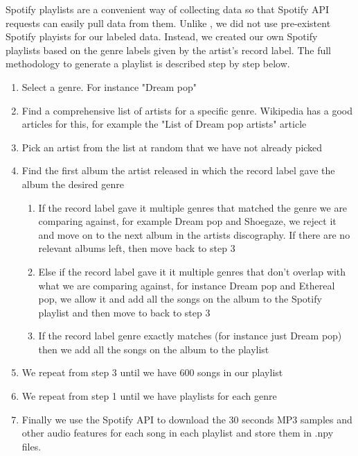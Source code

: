 \documentclass[letterpaper, 12 pt, conference]{ieeeconf}  %
\begin{document}
Spotify playlists are a convenient way of collecting data so that Spotify API requests can easily pull data from them. Unlike \cite{c5}, we did not use pre-existent Spotify playists for our labeled data. Instead, we created our own Spotify playlists based on the genre labels given by the artist’s record label. The full methodology to generate a playlist is described step by step below. 

\begin{enumerate}
    \item Select a genre. For instance "Dream pop"
    \item Find a comprehensive list of artists for a specific genre. Wikipedia has a good articles for this, for example the "List of Dream pop artists" article
    \item Pick an artist from the list at random that we have not already picked
    \item Find the first album the artist released in which the record label gave the album the desired genre
    \begin{enumerate}
        \item If the record label gave it multiple genres that matched the genre we are comparing against, for example Dream pop and Shoegaze, we reject it and move on to the next album in the artists discography. If there are no relevant albums left, then move back to step 3
        \item Else if the record label gave it it multiple genres that don't overlap with what we are comparing against, for instance Dream pop and Ethereal pop, we allow it and add all the songs on the album to the Spotify playlist and then move to back to step 3
        \item If the record label genre exactly matches (for instance just Dream pop) then we add all the songs on the album to the playlist
    \end{enumerate}

    \item We repeat from step 3 until we have 600 songs in our playlist
    \item We repeat from step 1 until we have playlists for each genre
    \item Finally we use the Spotify API to download the 30 seconds MP3 samples and other audio features for each song in each playlist and store them in .npy files.
\end{enumerate}
\end{document}

